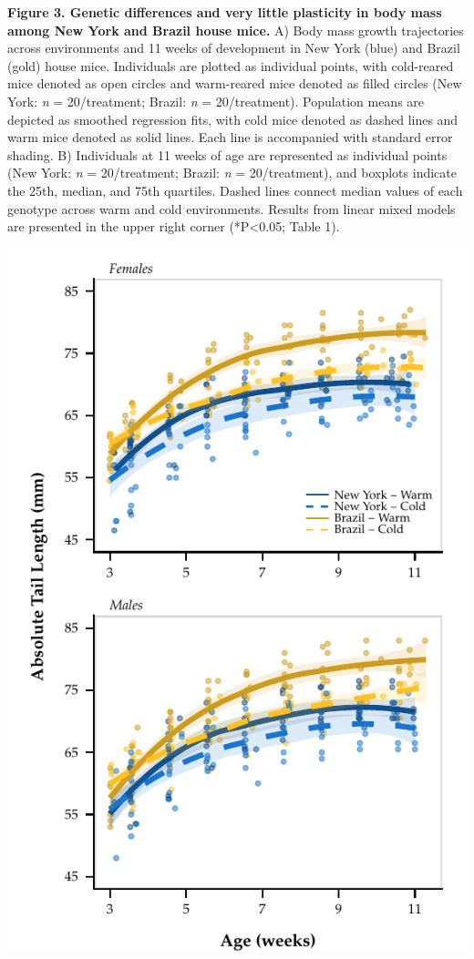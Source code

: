 \documentclass[
]{article}
\begin{document}
\textbf{Figure 3. Genetic differences and very little plasticity in body
mass among New York and Brazil house mice.} A) Body mass growth
trajectories across environments and 11 weeks of development in New York
(blue) and Brazil (gold) house mice. Individuals are plotted as
individual points, with cold-reared mice denoted as open circles and
warm-reared mice denoted as filled circles (New York: \emph{n} =
20/treatment; Brazil: \emph{n} = 20/treatment). Population means are
depicted as smoothed regression fits, with cold mice denoted as dashed
lines and warm mice denoted as solid lines. Each line is accompanied
with standard error shading. B) Individuals at 11 weeks of age are
represented as individual points (New York: \emph{n} = 20/treatment;
Brazil: \emph{n} = 20/treatment), and boxplots indicate the 25th,
median, and 75th quartiles. Dashed lines connect median values of each
genotype across warm and cold environments. Results from linear mixed
models are presented in the upper right corner (*P\textless0.05; Table
1).

\newpage

\includegraphics{../results/figures/Weekly_Tails.pdf}
\end{document}
